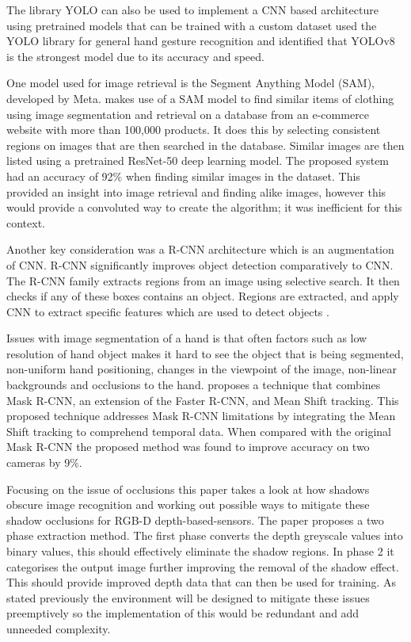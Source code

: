 \documentclass[conference]{IEEEtran}
\begin{document}
The library YOLO can also be used to implement a CNN based architecture using pretrained models that can be trained with a custom dataset \cite{hand:gesture:yolo:2023} used the YOLO library for general hand gesture recognition and identified that YOLOv8 is the strongest model due to its accuracy and speed.

One model used for image retrieval is the Segment Anything Model (SAM), developed by Meta. \cite{SAM:2023} makes use of a SAM model to find similar items of clothing using image segmentation and retrieval on a database from an e-commerce website with more than 100,000 products. It does this by selecting consistent regions on images that are then searched in the database. Similar images are then listed using a pretrained ResNet-50 deep learning model. The proposed system had an accuracy of 92\% when finding similar images in the dataset. This provided an insight into image retrieval and finding alike images, however this would provide a convoluted way to create the algorithm; it was inefficient for this context.

Another key consideration was a R-CNN architecture which is an augmentation of CNN. R-CNN significantly improves object detection comparatively to CNN. The R-CNN family extracts regions from an image using selective search. It then checks if any of these boxes contains an object. Regions are extracted, and apply CNN to extract specific features which are used to detect objects \cite{RCNN:2023}.

Issues with image segmentation of a hand is that often factors such as low resolution of hand object makes it hard to see the object that is being segmented, non-uniform hand positioning, changes in the viewpoint of the image, non-linear backgrounds and occlusions to the hand. \cite{segmentationRCNN:2018} proposes a technique that combines Mask R-CNN, an extension of the Faster R-CNN, and Mean Shift tracking. This proposed technique addresses Mask R-CNN limitations by integrating the Mean Shift tracking to comprehend temporal data. When compared with the original Mask R-CNN the proposed method was found to improve accuracy on two cameras by 9\%.

Focusing on the issue of occlusions this paper \cite{ding2022rgb} takes a look at how shadows obscure image recognition and working out possible ways to mitigate these shadow occlusions for RGB-D depth-based-sensors. The paper proposes a two phase extraction method. The first phase converts the depth greyscale values into binary values, this should effectively eliminate the shadow regions. In phase 2 it categorises the output image further improving the removal of the shadow effect. This should provide improved depth data that can then be used for training. As stated previously the environment will be designed to mitigate these issues preemptively so the implementation of this would be redundant and add unneeded complexity.
\end{document}
